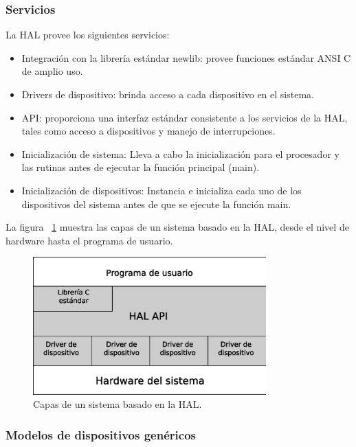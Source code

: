 \subsubsection{Servicios}

La HAL provee los siguientes servicios:

\begin{itemize}
	\item Integración con la librería estándar newlib: provee funciones estándar ANSI C de amplio uso.
	\item Drivers de dispositivo: brinda acceso a cada dispositivo en el sistema.
	\item API: proporciona una interfaz estándar consistente a los servicios de la HAL, tales como acceso a dispositivos y manejo de interrupciones.
	\item Inicialización de sistema: Lleva a cabo la inicialización para el procesador y las rutinas antes de ejecutar la función principal (main).
	\item Inicialización de dispositivos: Instancia e inicializa cada uno de los dispositivos del sistema antes de que se ejecute la función main.
\end{itemize}

La figura ~\ref{fig:hal} muestra las capas de un sistema basado en la HAL, desde el nivel de hardware hasta el programa de usuario.

\begin{figure}[H]
  \centering
	\includegraphics[width=0.80\textwidth]{3-arquitectura/graf/hal.eps}
  \caption{Capas de un sistema basado en la HAL.}
  \label{fig:hal}
\end{figure}

\subsubsection{Modelos de dispositivos genéricos}

